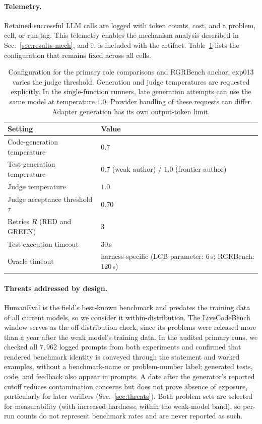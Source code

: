 \paragraph{Telemetry.} Retained successful LLM calls are logged with token counts, cost, and a problem, cell,
or run tag. This telemetry enables the mechanism analysis described in
Sec.~\ref{sec:results-mech}, and it is included with the artifact. Table~\ref{tab:config} lists the
configuration that remains fixed across all cells.

\begin{table}[t]
\centering
\small
\caption{Configuration for the primary role comparisons and RGRBench anchor; exp013 varies
the judge threshold.
Generation and judge temperatures are requested explicitly. In the single-function
runners, late generation attempts can use the same model at temperature $1.0$. Provider
handling of these requests can differ. Adapter generation has its own output-token limit.}
\label{tab:config}
\begin{tabular}{ll}
\toprule
Setting & Value \\
\midrule
Code-generation temperature & $0.7$ \\
Test-generation temperature & $0.7$ (weak author) / $1.0$ (frontier author) \\
Judge temperature & $1.0$ \\
Judge acceptance threshold $\tau$ & $0.70$ \\
Retries $R$ (RED and GREEN) & $3$ \\
Test-execution timeout & $30$\,s \\
Oracle timeout & harness-specific (LCB parameter: $6$\,s; RGRBench: $120$\,s) \\
\bottomrule
\end{tabular}
\end{table}

\paragraph{Threats addressed by design.} HumanEval is the field's best-known benchmark and
predates the training data of all current models, so we consider it within-distribution. The
LiveCodeBench window serves as the off-distribution check, since its problems were released more
than a year after the weak model's training data. In the audited primary runs, we checked all $7{,}962$ logged prompts from both experiments and confirmed that rendered
benchmark identity is conveyed through the statement and worked examples, without a
benchmark-name or problem-number label; generated tests, code, and feedback also appear in prompts. A date after the generator's reported cutoff reduces contamination concerns but does not
prove absence of exposure, particularly for later verifiers (Sec.~\ref{sec:threats}). Both problem sets are selected for measurability (with increased hardness; within the
weak-model band), so per-run counts do not represent benchmark rates and are never reported as
such.

